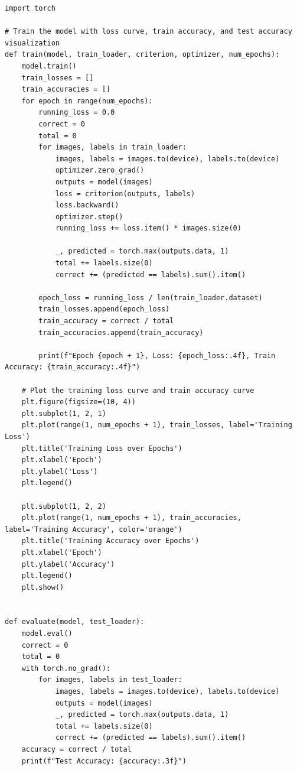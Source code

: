 \documentclass[a4paper,12pt]{article}
\begin{document}
\begin{lstlisting}
import torch

# Train the model with loss curve, train accuracy, and test accuracy visualization
def train(model, train_loader, criterion, optimizer, num_epochs):
    model.train()
    train_losses = []
    train_accuracies = []
    for epoch in range(num_epochs):
        running_loss = 0.0
        correct = 0
        total = 0
        for images, labels in train_loader:
            images, labels = images.to(device), labels.to(device)
            optimizer.zero_grad()
            outputs = model(images)
            loss = criterion(outputs, labels)
            loss.backward()
            optimizer.step()
            running_loss += loss.item() * images.size(0)
            
            _, predicted = torch.max(outputs.data, 1)
            total += labels.size(0)
            correct += (predicted == labels).sum().item()

        epoch_loss = running_loss / len(train_loader.dataset)
        train_losses.append(epoch_loss)
        train_accuracy = correct / total
        train_accuracies.append(train_accuracy)
        
        print(f"Epoch {epoch + 1}, Loss: {epoch_loss:.4f}, Train Accuracy: {train_accuracy:.4f}")

    # Plot the training loss curve and train accuracy curve
    plt.figure(figsize=(10, 4))
    plt.subplot(1, 2, 1)
    plt.plot(range(1, num_epochs + 1), train_losses, label='Training Loss')
    plt.title('Training Loss over Epochs')
    plt.xlabel('Epoch')
    plt.ylabel('Loss')
    plt.legend()

    plt.subplot(1, 2, 2)
    plt.plot(range(1, num_epochs + 1), train_accuracies, label='Training Accuracy', color='orange')
    plt.title('Training Accuracy over Epochs')
    plt.xlabel('Epoch')
    plt.ylabel('Accuracy')
    plt.legend()
    plt.show()


def evaluate(model, test_loader):
    model.eval()
    correct = 0
    total = 0
    with torch.no_grad():
        for images, labels in test_loader:
            images, labels = images.to(device), labels.to(device)
            outputs = model(images)
            _, predicted = torch.max(outputs.data, 1)
            total += labels.size(0)
            correct += (predicted == labels).sum().item()
    accuracy = correct / total
    print(f"Test Accuracy: {accuracy:.3f}")
\end{lstlisting}
\end{document}
